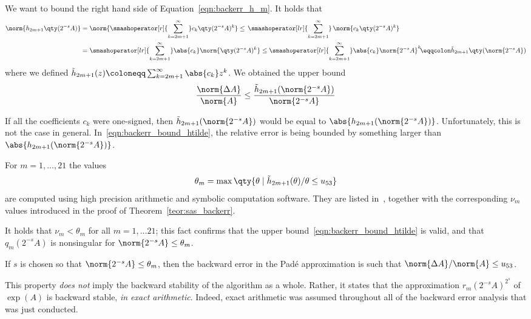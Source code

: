 We want to bound the right hand side of Equation~\eqref{eqn:backerr_h_m}. 
It holds that 
\begin{align*}
	\norm{h_{2m+1}\qty(2^{-s}A)} &= \norm{\smashoperator[r]{\sum_{k=2m+1}^{\infty}}c_k\qty(2^{-s}A)^k}\le\,\smashoperator[lr]{\sum_{k=2m+1}^{\infty}}\,\norm{c_k\qty(2^{-s}A)^k}\\
	&=\smashoperator[lr]{\sum_{k=2m+1}^{\infty}}\abs{c_k}\norm{\qty(2^{-s}A)^k}\le\smashoperator[lr]{\sum_{k=2m+1}^{\infty}}\abs{c_k}\norm{2^{-s}A}^k\!\eqqcolon\tilde{h}_{2m+1}\qty(\norm{2^{-s}A})
\end{align*}
where we defined $\tilde{h}_{2m+1}(z)\coloneqq\sum_{k=2m+1}^{\infty}\abs{c_k}z^k$. We obtained the upper bound 
\begin{equation}\label{eqn:backerr_bound_htilde}
	\frac{\norm{\Delta{A}}}{\norm{A}}\le\frac{\tilde{h}_{2m+1}(\norm{2^{-s}A})}{\norm{2^{-s}A}}
\end{equation}
\begin{oss*}
	If all the coefficients $c_k$ were one-signed, then $\tilde{h}_{2m+1}(\norm{2^{-s}A})$ would be equal to $\abs{h_{2m+1}(\norm{2^{-s}A})}$. Unfortunately, this is not the case in general. 
	In~\eqref{eqn:backerr_bound_htilde}, the relative error is being bounded by something larger than $\abs{h_{2m+1}(\norm{2^{-s}A})}$.
\end{oss*}
For $m=1,\dots,21$ the values
\begin{equation}\label{eqn:theta_m_def}
	\theta_m=\max\qty{\theta\mid\tilde{h}_{2m+1}(\theta)/\theta\le u_{53}}
\end{equation}
are computed using high precision arithmetic and symbolic computation software. They are listed in~\cite[Table~2.1]{higham:SaS_revisited}, together with the corresponding $\nu_m$ values introduced in the proof of Theorem~\ref{teor:sas_backerr}.
\begin{oss*}
	It holds that $\nu_m<\theta_m$ for all $m=1,\dots 21$; this fact confirms that the upper bound~\eqref{eqn:backerr_bound_htilde} is valid, and that $q_m(2^{-s}A)$ is nonsingular for $\norm{2^{-s}A}\le\theta_m$.
\end{oss*}
If $s$ is chosen so that $\norm{2^{-s}A}\le\theta_m$, then the backward error in the Padé approximation is such that $\norm{\Delta{A}}/\norm{A}\le u_{53}$.
\begin{oss*}
	This property \emph{does not} imply the backward stability of the algorithm as a whole. Rather, it states that the approximation $r_m(2^{-s}A)^{2^s}$ of $\exp(A)$ is backward stable, \emph{in exact arithmetic}. Indeed, exact arithmetic was assumed throughout all of the backward error analysis that was just conducted.
\end{oss*}
